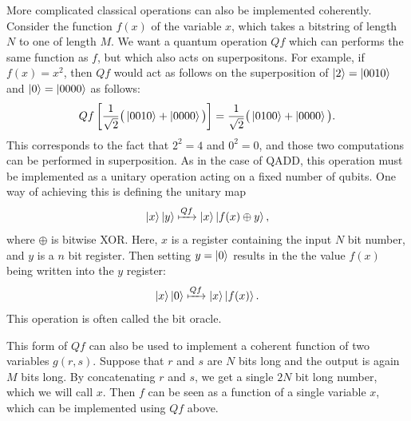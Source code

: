 More complicated classical operations can also be implemented coherently. Consider the function $f(x)$ of the variable $x$, which takes a bitstring of length $N$ to one of length $M$.  We want a quantum operation $Qf$ which can performs the same function as $f$, but which also acts on superpositons. For example, if $f(x)=x^2$, then $Qf$ would act as follows on the superposition of $\left\vert{2}\right\rangle = \left\vert{0010}\right\rangle$ and $\left\vert{0}\right\rangle=\left\vert{0000}\right\rangle$ as follows: $$Qf\left[\frac{1}{\sqrt{2}}\big(\left\vert{0010}\right\rangle+\left\vert{0000}\right\rangle\big)\right]=\frac{1}{\sqrt{2}}\big(\left\vert{0100}\right\rangle+\left\vert{0000}\right\rangle\big).$$ This corresponds to the fact that $2^2 = 4$ and $0^2 = 0$, and those two computations can be performed in superposition. As in the case of QADD, this operation must be implemented as a unitary operation acting on a fixed number of qubits. One way of achieving this is defining the unitary map $$\left\vert{x}\right\rangle\left\vert{y}\right\rangle \xmapsto{Qf}  \left\vert{x}\right\rangle\left\vert{f(x) \oplus y}\right\rangle,$$ where $\oplus$ is bitwise XOR. Here, $x$ is a register containing the input $N$ bit number, and $y$ is a $n$ bit register. Then setting $y=\left\vert{0}\right\rangle$ results in the the value $f(x)$ being written into the $y$ register: $$\left\vert{x}\right\rangle\left\vert{0}\right\rangle \xmapsto{Qf}  \left\vert{x}\right\rangle\left\vert{f(x)}\right\rangle.$$ This operation is often called the bit oracle. 

This form of $Qf$ can also be used to implement a coherent function of two variables $g(r,s)$. Suppose that $r$ and $s$ are $N$ bits long and the output is again $M$ bits long. By concatenating $r$ and $s$, we get a single $2N$ bit long number, which we will call $x$. Then $f$ can be seen as a function of a single variable $x$, which can be implemented using $Qf$ above. 

